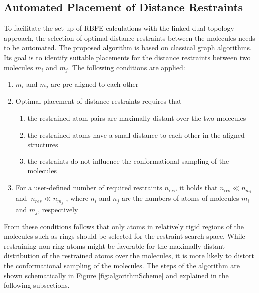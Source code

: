 \subsection{Automated Placement of Distance Restraints}
To facilitate the set-up of RBFE calculations with the linked dual topology approach, the selection of optimal distance restraints between the molecules needs to be automated.
The proposed algorithm is based on classical graph algorithms. Its goal is to identify suitable placements for the distance restraints between two molecules $m_i$ and $m_j$.
%
The following conditions are applied:
\begin{enumerate}
    \item $m_i$ and $m_j$ are pre-aligned to each other 
    \item Optimal placement of distance restraints requires that 
    \begin{enumerate}
        \item the restrained atom pairs are maximally distant over the two molecules
        \item the restrained atoms have a small distance to each other in the aligned structures
        \item the restraints do not influence the conformational sampling of the molecules
    \end{enumerate}
    \item For a user-defined number of required restraints $n_{\text{res}}$, it holds that $n_{\text{res}} \ll n_{m_i} $ and $ ~n_{res} \ll n_{m_j}$ , where $n_i$ and $n_j$ are the numbers of atoms of molecules $m_i$ and $m_j$, respectively
\end{enumerate}
From these conditions follows that only atoms in relatively rigid regions of the molecules such as rings should be selected for the restraint search space. While restraining non-ring atoms might be favorable for the maximally distant distribution of the restrained atoms over the molecules, it is more likely to distort the conformational sampling of the molecules. The steps of the algorithm are shown schematically in Figure \ref{fig:algorithmScheme} and explained in the following subsections.

